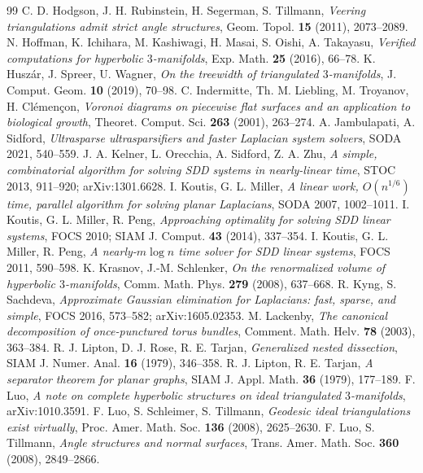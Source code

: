\documentclass[11pt]{amsart}
\theoremstyle{definition}
\theoremstyle{remark}
\begin{document}
\begin{thebibliography}{99}
 C. D. Hodgson, J. H. Rubinstein, H. Segerman, S. Tillmann, \emph{Veering triangulations admit strict angle structures}, Geom. Topol. \textbf{15} (2011), 2073--2089.
 N. Hoffman, K. Ichihara, M. Kashiwagi, H. Masai, S. Oishi, A. Takayasu, \emph{Verified computations for hyperbolic $3$-manifolds}, Exp. Math. \textbf{25} (2016), 66--78.
 K. Husz\'ar, J. Spreer, U. Wagner, \emph{On the treewidth of triangulated $3$-manifolds}, J. Comput. Geom. \textbf{10} (2019), 70--98.
 C. Indermitte, Th. M. Liebling, M. Troyanov, H. Cl\'emen\c{c}on, \emph{Voronoi diagrams on piecewise flat surfaces and an application to biological growth}, Theoret. Comput. Sci. \textbf{263} (2001), 263--274.
 A. Jambulapati, A. Sidford, \emph{Ultrasparse ultrasparsifiers and faster Laplacian system solvers}, SODA 2021, 540--559.
 J. A. Kelner, L. Orecchia, A. Sidford, Z. A. Zhu, \emph{A simple, combinatorial algorithm for solving SDD systems in nearly-linear time}, STOC 2013, 911--920; arXiv:1301.6628.
 I. Koutis, G. L. Miller, \emph{A linear work, $O(n^{1/6})$ time, parallel algorithm for solving planar Laplacians}, SODA 2007, 1002--1011.
 I. Koutis, G. L. Miller, R. Peng, \emph{Approaching optimality for solving SDD linear systems}, FOCS 2010; SIAM J. Comput. \textbf{43} (2014), 337--354.
 I. Koutis, G. L. Miller, R. Peng, \emph{A nearly-$m\log n$ time solver for SDD linear systems}, FOCS 2011, 590--598.
 K. Krasnov, J.-M. Schlenker, \emph{On the renormalized volume of hyperbolic $3$-manifolds}, Comm. Math. Phys. \textbf{279} (2008), 637--668.
 R. Kyng, S. Sachdeva, \emph{Approximate Gaussian elimination for Laplacians: fast, sparse, and simple}, FOCS 2016, 573--582; arXiv:1605.02353.
 M. Lackenby, \emph{The canonical decomposition of once-punctured torus bundles}, Comment. Math. Helv. \textbf{78} (2003), 363--384.
 R. J. Lipton, D. J. Rose, R. E. Tarjan, \emph{Generalized nested dissection}, SIAM J. Numer. Anal. \textbf{16} (1979), 346--358.
 R. J. Lipton, R. E. Tarjan, \emph{A separator theorem for planar graphs}, SIAM J. Appl. Math. \textbf{36} (1979), 177--189.
 F. Luo, \emph{A note on complete hyperbolic structures on ideal triangulated $3$-manifolds}, arXiv:1010.3591.
 F. Luo, S. Schleimer, S. Tillmann, \emph{Geodesic ideal triangulations exist virtually}, Proc. Amer. Math. Soc. \textbf{136} (2008), 2625--2630.
 F. Luo, S. Tillmann, \emph{Angle structures and normal surfaces}, Trans. Amer. Math. Soc. \textbf{360} (2008), 2849--2866.

\end{thebibliography}
\end{document}
